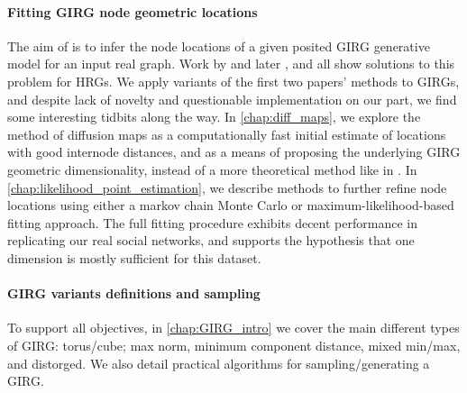 


\paragraph{Fitting GIRG node geometric locations} The aim of  is to infer the node locations of a given posited GIRG generative model for an input real graph. Work by \cite{boguna2010sustaining} and later \cite{garcia2019mercator}, \cite{blasius2018efficient} and \cite{blasius2021force} all show solutions to this problem for HRGs. We apply variants of the first two papers' methods to GIRGs, and despite lack of novelty and questionable implementation on our part, we find some interesting tidbits along the way.
In \cref{chap:diff_maps}, we explore the method of diffusion maps as a computationally fast initial estimate of locations with good internode distances, and as a means of proposing the underlying GIRG geometric dimensionality, instead of a more theoretical method like in \cite{friedrich2023cliques}.
In \cref{chap:likelihood_point_estimation}, we describe methods to further refine node locations using either a markov chain Monte Carlo or maximum-likelihood-based fitting approach.
The full fitting procedure exhibits decent performance in replicating our real social networks, and supports the hypothesis that one dimension is mostly sufficient for this dataset.

\paragraph{GIRG variants definitions and sampling} To support all objectives, in \cref{chap:GIRG_intro} we cover the main different types of GIRG: torus/cube; max norm, minimum component distance, mixed min/max, and distorged. We also detail practical algorithms for sampling/generating a GIRG.

